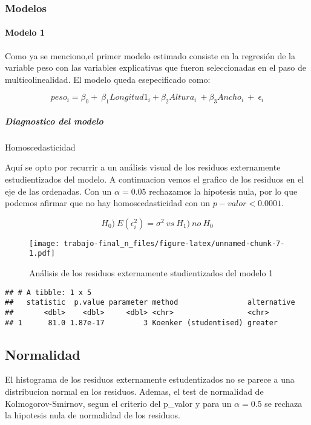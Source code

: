 \documentclass[
]{article}
\begin{document}
\subsubsection{Modelos}\label{modelos}

\paragraph{Modelo 1}\label{modelo-1}

Como ya se menciono,el primer modelo estimado consiste en la regresión
de la variable peso con las variables explicativas que fueron
seleccionadas en el paso de multicolinealidad. El modelo queda
esepecificado como:

\[peso_{i}=  \beta_0 +\ \beta_1Longitud1_{i} + \beta_2Altura_{i}\ +\beta_3Ancho_{i}\ +\ \epsilon_{i}\]

\subparagraph{Diagnostico del modelo}\label{diagnostico-del-modelo}

Homoscedasticidad

Aquí se opto por recurrir a un análisis visual de los residuos
externamente estudientizados del modelo. A continuacion vemos el grafico
de los residuos en el eje de las ordenadas. Con un \(\alpha=0.05\)
rechazamos la hipotesis nula, por lo que podemos afirmar que no hay
homoscedasticidad con un \(p-valor < 0.0001\).

\[H_0)\ E(\epsilon_{i}^{2}) =  \sigma^2\ vs\ H_1)\ no\ H_0\]

\begin{figure}
\centering
\texttt{[image: trabajo-final\_n\_files/figure-latex/unnamed-chunk-7-1.pdf]}
\caption{Análisis de los residuos externamente studientizados del modelo
1}
\end{figure}

\begin{verbatim}
## # A tibble: 1 x 5
##   statistic  p.value parameter method                alternative
##       <dbl>    <dbl>     <dbl> <chr>                 <chr>      
## 1      81.0 1.87e-17         3 Koenker (studentised) greater
\end{verbatim}

\subsection{Normalidad}\label{normalidad}

El histograma de los residuos externamente estudentizados no se parece a
una distribucion normal en los residuos. Ademas, el test de normalidad
de Kolmogorov-Smirnov, segun el criterio del p\_valor y para un
\(\alpha=0.5\) se rechaza la hipotesis nula de normalidad de los
residuos.
\end{document}
